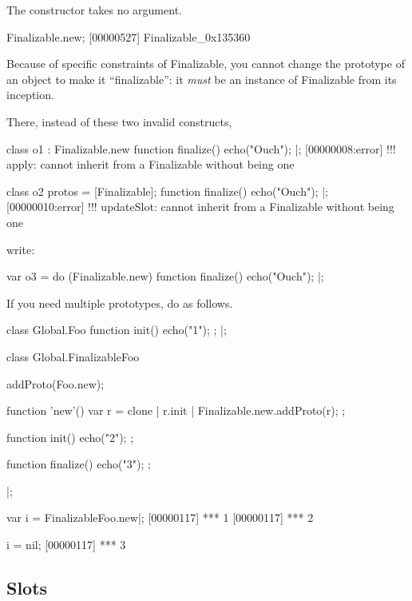 The constructor takes no argument.

\begin{urbiscript}
Finalizable.new;
[00000527] Finalizable_0x135360
\end{urbiscript}

\bigskip

Because of specific constraints of Finalizable, you cannot change the
prototype of an object to make it ``finalizable'': it \emph{must} be an
instance of Finalizable from its inception.

There, instead of these two invalid constructs,

\begin{urbiscript}
class o1 : Finalizable.new
{
  function finalize()
  {
    echo("Ouch");
  }
}|;
[00000008:error] !!! apply: cannot inherit from a Finalizable without being one

class o2
{
  protos = [Finalizable];
  function finalize()
  {
    echo("Ouch");
  }
}|;
[00000010:error] !!! updateSlot: cannot inherit from a Finalizable without being one
\end{urbiscript}

write:

\begin{urbiscript}
var o3 =
  do (Finalizable.new)
  {
    function finalize()
    {
      echo("Ouch");
    }
  }|;
\end{urbiscript}

\bigskip

If you need multiple prototypes, do as follows.

\begin{urbiscript}
class Global.Foo
{
  function init()
  {
    echo("1");
  };
}|;

class Global.FinalizableFoo
{
  addProto(Foo.new);

  function 'new'()
  {
    var r = clone |
    r.init |
    Finalizable.new.addProto(r);
  };

  function init()
  {
    echo("2");
  };

  function finalize()
  {
    echo("3");
  };

}|;

var i = FinalizableFoo.new|;
[00000117] *** 1
[00000117] *** 2

i = nil;
[00000117] *** 3
\end{urbiscript}



\subsection{Slots}

